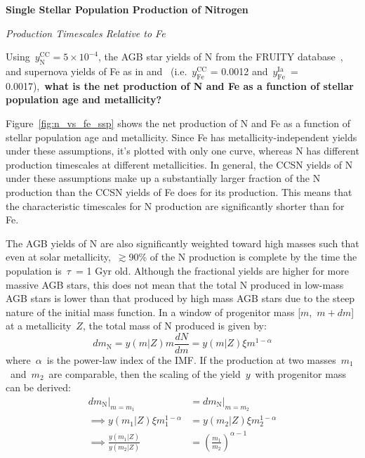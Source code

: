\documentclass[\main/notes.tex]{subfiles}
\begin{document}
 
\begin{center} 
\textbf{{\Large Single Stellar Population Production of Nitrogen}} 
\end{center} 

\noindent 
{\Large \textit{Production Timescales Relative to Fe}} 
\par\noindent 
Using~$y_\text{N}^\text{CC} = 5\times10^{-4}$, the AGB star yields of N from 
the FRUITY database~\citep{Cristallo2011}, and supernova yields of Fe as in 
\citet{Johnson2020} and~\citet{Weinberg2017} (i.e.~$y_\text{Fe}^\text{CC}$ = 
0.0012 and~$y_\text{Fe}^\text{Ia}$~= 0.0017),~\textbf{what is the net 
production of N and Fe as a function of stellar population age and 
metallicity?} 
\par 
Figure~\ref{fig:n_vs_fe_ssp} shows the net production of N and Fe as a function 
of stellar population age and metallicity. Since Fe has metallicity-independent 
yields under these assumptions, it's plotted with only one curve, whereas N has 
different production timescales at different metallicities. In general, the 
CCSN yields of N under these assumptions make up a substantially larger 
fraction of the N production than the CCSN yields of Fe does for its 
production. This means that the characteristic timescales for N production are 
significantly shorter than for Fe. 
\par
The AGB yields of N are also significantly weighted toward high masses such 
that even at solar metallicity,~$\gtrsim$90\% of the N production is complete 
by the time the population is~$\tau$~= 1 Gyr old. Although the fractional 
yields are higher for more massive AGB stars, this does not mean that the 
total N produced in low-mass AGB stars is lower than that produced by high mass 
AGB stars due to the steep nature of the initial mass function. In a window of 
progenitor mass [$m$,~$m + dm$] at a metallicity~$Z$, the total mass of N 
produced is given by: 
\begin{equation} 
dm_\text{N} = y(m|Z)m\frac{dN}{dm} = y(m|Z)\xi m^{1 - \alpha} 
\end{equation} 
where~$\alpha$~is the power-law index of the IMF. If the production at two 
masses~$m_1$~and~$m_2$~are comparable, then the scaling of the yield~$y$~with 
progenitor mass can be derived: 
\begin{subequations}\begin{align} 
dm_\text{N}|_{m = m_1} &= dm_\text{N}|_{m = m_2} \\ 
\implies y(m_1|Z) \xi m_1^{1 - \alpha} &= y(m_2|Z) \xi m_2^{1 - \alpha} \\ 
\implies \frac{y(m_1|Z)}{y(m_2|Z)} &= \left(\frac{m_1}{m_2}\right)^{\alpha - 1} 
\end{align}\end{subequations} 
\end{document}
